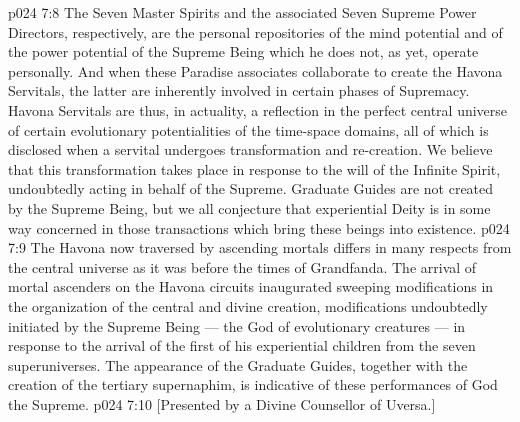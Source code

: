 \vs p024 7:8 \pc The Seven Master Spirits and the associated Seven Supreme Power Directors, respectively, are the personal repositories of the mind potential and of the power potential of the Supreme Being which he does not, as yet, operate personally. And when these Paradise associates collaborate to create the Havona Servitals, the latter are inherently involved in certain phases of Supremacy. Havona Servitals are thus, in actuality, a reflection in the perfect central universe of certain evolutionary potentialities of the time\hyp{}space domains, all of which is disclosed when a servital undergoes transformation and re\hyp{}creation. We believe that this transformation takes place in response to the will of the Infinite Spirit, undoubtedly acting in behalf of the Supreme. Graduate Guides are not created by the Supreme Being, but we all conjecture that experiential Deity is in some way concerned in those transactions which bring these beings into existence.
\vs p024 7:9 The Havona now traversed by ascending mortals differs in many respects from the central universe as it was before the times of Grandfanda. The arrival of mortal ascenders on the Havona circuits inaugurated sweeping modifications in the organization of the central and divine creation, modifications undoubtedly initiated by the Supreme Being --- the God of evolutionary creatures --- in response to the arrival of the first of his experiential children from the seven superuniverses. The appearance of the Graduate Guides, together with the creation of the tertiary supernaphim, is indicative of these performances of God the Supreme.
\vsetoff
\vs p024 7:10 [Presented by a Divine Counsellor of Uversa.]
\quizlink
